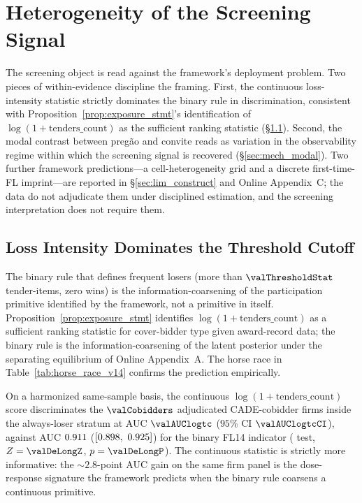 \section{Heterogeneity of the Screening Signal}
\label{sec:mechanisms}

The screening object is read against the framework's deployment
problem. Two pieces of within-evidence discipline the framing.
First, the continuous loss-intensity statistic strictly
dominates the binary rule in discrimination, consistent with
Proposition~\ref{prop:exposure_stmt}'s identification of
$\log(1+\text{tenders\_count})$ as the sufficient ranking
statistic (\S\ref{sec:mech_horse_race}). Second, the modal
contrast between preg\~ao and convite reads as variation in the
observability regime within which the screening signal is
recovered (\S\ref{sec:mech_modal}). Two further framework
predictions---a cell-heterogeneity grid and a discrete
first-time-FL imprint---are reported in
\S\ref{sec:lim_construct} and Online Appendix~C; the data do not
adjudicate them under disciplined estimation, and the screening
interpretation does not require them.

\subsection{Loss Intensity Dominates the Threshold Cutoff}
\label{sec:mech_horse_race}

The binary rule that defines frequent losers (more than
$\valThresholdStat$ tender-items, zero wins) is the
information-coarsening of the participation primitive identified
by the framework, not a primitive in itself.
Proposition~\ref{prop:exposure_stmt} identifies
$\log(1+\text{tenders\_count})$ as a sufficient ranking statistic
for cover-bidder type given award-record data; the binary rule
is the information-coarsening of the latent posterior under the
separating equilibrium of Online Appendix~A. The horse race in
Table~\ref{tab:horse_race_v14} confirms the prediction
empirically.



On a harmonized same-sample basis, the continuous
$\log(1+\text{tenders\_count})$ score discriminates the
$\valCobidders$ adjudicated CADE-cobidder firms inside the
always-loser stratum at AUC $\valAUClogtc$ ($95\%$ CI
$\valAUClogtcCI$), against AUC $0.911$
($[0.898,\ 0.925]$) for the binary FL14 indicator
(\citealt{delong1988comparing} test, $Z = \valDeLongZ$,
$p = \valDeLongP$). The continuous statistic is strictly more
informative: the $\sim\!2.8$-point AUC gain on the same firm
panel is the dose-response signature the framework predicts
when the binary rule coarsens a continuous primitive.

